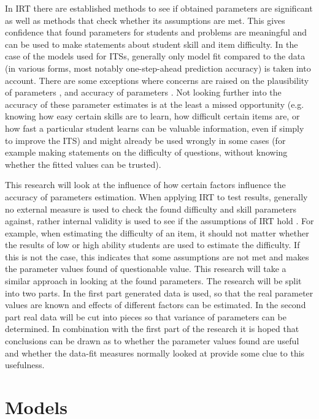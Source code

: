 \documentclass{scrartcl}
\begin{document}
In IRT there are established methods to see if obtained parameters are significant as well as methods that check whether its assumptions are met. This gives confidence that found parameters for students and problems are meaningful and can be used to make statements about student skill and item difficulty. In the case of the models used for ITSs, generally only model fit compared to the data (in various forms, most notably one-step-ahead prediction accuracy) is taken into account. There are some exceptions where concerns are raised on the plausibility of parameters \cite{ktpfa}, \cite{knowledgeproblem} and accuracy of parameters \cite{blackart}. Not looking further into the accuracy of these parameter estimates is at the least a missed opportunity (e.g. knowing how easy certain skills are to learn, how difficult certain items are, or how fast a particular student learns can be valuable information, even if simply to improve the ITS) and might already be used wrongly in some cases (for example making statements on the difficulty of questions, without knowing whether the fitted values can be trusted).

This research will look at the influence of how certain factors influence the accuracy of parameters estimation. When applying IRT to test results, generally no external measure is used to check the found difficulty and skill parameters against, rather internal validity is used to see if the assumptions of IRT hold \cite{hambleton}. For example, when estimating the difficulty of an item, it should not matter whether the results of low or high ability students are used to estimate the difficulty. If this is not the case, this indicates that some assumptions are not met and makes the parameter values found of questionable value. This research will take a similar approach in looking at the found parameters. The research will be split into two parts. In the first part generated data is used, so that the real parameter values are known and effects of different factors can be estimated. In the second part real data will be cut into pieces so that variance of parameters can be determined. In combination with the first part of the research it is hoped that conclusions can be drawn as to whether the parameter values found are useful and whether the data-fit measures normally looked at provide some clue to this usefulness.

\section{Models}
\end{document}
